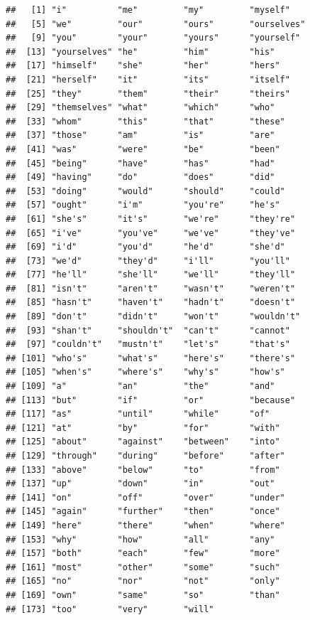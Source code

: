 \documentclass[
  12pt,
]{style/krantz}
\begin{document}
\begin{verbatim}
##   [1] "i"          "me"         "my"         "myself"    
##   [5] "we"         "our"        "ours"       "ourselves" 
##   [9] "you"        "your"       "yours"      "yourself"  
##  [13] "yourselves" "he"         "him"        "his"       
##  [17] "himself"    "she"        "her"        "hers"      
##  [21] "herself"    "it"         "its"        "itself"    
##  [25] "they"       "them"       "their"      "theirs"    
##  [29] "themselves" "what"       "which"      "who"       
##  [33] "whom"       "this"       "that"       "these"     
##  [37] "those"      "am"         "is"         "are"       
##  [41] "was"        "were"       "be"         "been"      
##  [45] "being"      "have"       "has"        "had"       
##  [49] "having"     "do"         "does"       "did"       
##  [53] "doing"      "would"      "should"     "could"     
##  [57] "ought"      "i'm"        "you're"     "he's"      
##  [61] "she's"      "it's"       "we're"      "they're"   
##  [65] "i've"       "you've"     "we've"      "they've"   
##  [69] "i'd"        "you'd"      "he'd"       "she'd"     
##  [73] "we'd"       "they'd"     "i'll"       "you'll"    
##  [77] "he'll"      "she'll"     "we'll"      "they'll"   
##  [81] "isn't"      "aren't"     "wasn't"     "weren't"   
##  [85] "hasn't"     "haven't"    "hadn't"     "doesn't"   
##  [89] "don't"      "didn't"     "won't"      "wouldn't"  
##  [93] "shan't"     "shouldn't"  "can't"      "cannot"    
##  [97] "couldn't"   "mustn't"    "let's"      "that's"    
## [101] "who's"      "what's"     "here's"     "there's"   
## [105] "when's"     "where's"    "why's"      "how's"     
## [109] "a"          "an"         "the"        "and"       
## [113] "but"        "if"         "or"         "because"   
## [117] "as"         "until"      "while"      "of"        
## [121] "at"         "by"         "for"        "with"      
## [125] "about"      "against"    "between"    "into"      
## [129] "through"    "during"     "before"     "after"     
## [133] "above"      "below"      "to"         "from"      
## [137] "up"         "down"       "in"         "out"       
## [141] "on"         "off"        "over"       "under"     
## [145] "again"      "further"    "then"       "once"      
## [149] "here"       "there"      "when"       "where"     
## [153] "why"        "how"        "all"        "any"       
## [157] "both"       "each"       "few"        "more"      
## [161] "most"       "other"      "some"       "such"      
## [165] "no"         "nor"        "not"        "only"      
## [169] "own"        "same"       "so"         "than"      
## [173] "too"        "very"       "will"
\end{verbatim}
\end{document}
